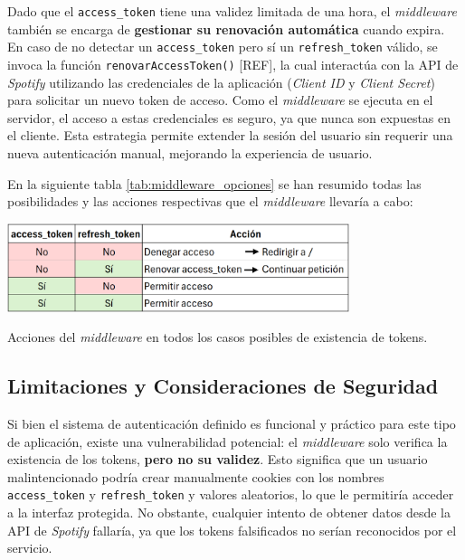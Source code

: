 Dado que el \texttt{access\_token} tiene una validez limitada de una hora, el \textit{middleware} también se encarga de \textbf{gestionar su renovación automática} cuando expira. En caso de no detectar un \texttt{access\_token} pero sí un \texttt{refresh\_token} válido, se invoca la función \texttt{renovarAccessToken()} [REF], la cual interactúa con la API de \textit{Spotify} utilizando las credenciales de la aplicación (\textit{Client ID} y \textit{Client Secret}) para solicitar un nuevo token de acceso. Como el \textit{middleware} se ejecuta en el servidor, el acceso a estas credenciales es seguro, ya que nunca son expuestas en el cliente. Esta estrategia permite extender la sesión del usuario sin requerir una nueva autenticación manual, mejorando la experiencia de usuario.

En la siguiente tabla \ref{tab:middleware_opciones} se han resumido todas las posibilidades y las acciones respectivas que el \textit{middleware} llevaría a cabo:

\begin{table}[htbp]
    \centering
    \includegraphics[width=0.75\textwidth]{figures/implementacion/middleware_opciones.png}
    \captionsetup{skip=10pt}
    \caption{Acciones del \textit{middleware} en todos los casos posibles de existencia de tokens.}
    \label{tab:middleware_opciones}
\end{table}

\subsection{Limitaciones y Consideraciones de Seguridad}

Si bien el sistema de autenticación definido es funcional y práctico para este tipo de aplicación, existe una vulnerabilidad potencial: el \textit{middleware} solo verifica la existencia de los tokens, \textbf{pero no su validez}. Esto significa que un usuario malintencionado podría crear manualmente cookies con los nombres \texttt{access\_token} y \texttt{refresh\_token} y valores aleatorios, lo que le permitiría acceder a la interfaz protegida. No obstante, cualquier intento de obtener datos desde la API de \textit{Spotify} fallaría, ya que los tokens falsificados no serían reconocidos por el servicio.

